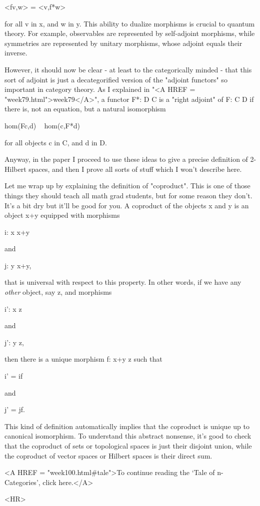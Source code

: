 <fv,w> = <v,f*w> 

for all v in x, and w in y.  This ability to dualize morphisms is
crucial to quantum theory.  For example, observables are represented
by self-adjoint morphisms, while symmetries are represented by unitary
morphisms, whose adjoint equals their inverse.

However, it should now be clear - at least to the categorically minded -
that this sort of adjoint is just a decategorified version of the
"adjoint functors" so important in category theory.  As I explained in
"<A HREF = "week79.html">week79</A>", a functor F*: D \to  C is a "right adjoint" of F: C \to  D if
there is, not an equation, but a natural isomorphism

hom(Fc,d) ~ hom(c,F*d) 

for all objects c in C, and d in D.  

Anyway, in the paper I proceed to use these ideas to give a precise
definition of 2-Hilbert spaces, and then I prove all sorts of stuff
which I won't describe here.

Let me wrap up by explaining the definition of "coproduct".  This is
one of those things they should teach all math grad students, but for
some reason they don't.  It's a bit dry but it'll be good for you.  A
coproduct of the objects x and y is an object x+y equipped with
morphisms

i: x \to  x+y  

and 

j: y \to  x+y,

that is universal with respect to this property.  In other words,
if we have any \emph{other} object, say z, and morphisms

i': x \to  z

and 

j': y \to  z,

then there is a unique morphism f: x+y \to  z such that 

i' = if  

and

j' = jf.

This kind of definition automatically implies that the coproduct is
unique up to canonical isomorphism.  To understand this abstract
nonsense, it's good to check that the coproduct of sets or topological
spaces is just their disjoint union, while the coproduct of vector
spaces or Hilbert spaces is their direct sum.


<A HREF = "week100.html#tale">To continue reading the `Tale of
n-Categories', click here.</A>


<HR>



